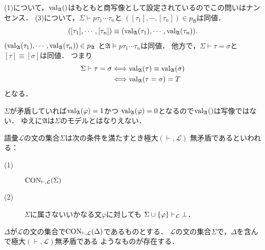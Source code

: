 	\begin{sketch}
		(1)について，$\operatorname{val}_{\mathfrak{A}}()$はもともと商写像として設定されているのでこの問いはナンセンス．
		(3)について，$\Sigma \vdash p\tau_{1}\cdots\tau_{n}$と
			$([\tau_{1}],\cdots,[\tau_{n}]) \in p_{\mathfrak{A}}$は同値．
			\begin{align}
				([\tau_{1}],\cdots,[\tau_{n}]) \equiv 
				(\operatorname{val}_{\mathfrak{A}}(\tau_{1}),\cdots,\operatorname{val}_{\mathfrak{A}}(\tau_{n})).
			\end{align}
			$(\operatorname{val}_{\mathfrak{A}}(\tau_{1}),\cdots,\operatorname{val}_{\mathfrak{A}}(\tau_{n})) \in p_{\mathfrak{A}}$
			と$\mathfrak{A} \models p\tau_{1}\cdots\tau_{n}$は同値．
			他方で，$\Sigma \vdash \tau = \sigma$と$[\tau] \equiv [\sigma]$は同値．
			つまり
			\begin{align}
				\Sigma \vdash \tau = \sigma 
				&\Longleftrightarrow 
				\operatorname{val}_{\mathfrak{A}}(\tau) \equiv \operatorname{val}_{\mathfrak{A}}(\sigma) \\
				&\Longleftrightarrow \operatorname{val}_{\mathfrak{A}}(\tau = \sigma) = T
			\end{align}
			となる．
	\end{sketch}
	
	$\Sigma$が矛盾していれば$\operatorname{val}_{\mathfrak{A}}(\varphi) = 1$かつ
	$\operatorname{val}_{\mathfrak{A}}(\varphi) = 0$となるので$\val{\mathfrak{A}}$は写像ではない．
	ゆえに$\mathfrak{A}$は$\Sigma$のモデルとはなりえない．
	
	\begin{screen}
		\begin{dfn}[定義2.12.11]
			語彙$\mathcal{L}$の文の集合$\Sigma$は次の条件を満たすとき極大$(\vdash,\mathcal{L})$
			無矛盾であるといわれる：
			\begin{description}
				\item[(1)] $\operatorname{CON}_{\vdash,\mathcal{L}}(\Sigma)$
				\item[(2)] $\Sigma$に属さないいかなる文$\varphi$に対しても
					$\Sigma \cup \{\varphi\} \vdash_{{\scriptsize \mathcal{L}}} \bot$．
			\end{description}
		\end{dfn}
	\end{screen}
	
	\begin{screen}
		\begin{thm}[補題2.12.12]
			$\Delta$が$\mathcal{L}$の文の集合で$\operatorname{CON}_{\vdash,\mathcal{L}}(\Delta)$であるものとする．
			$\mathcal{L}$の文の集合$\Sigma$で，$\Delta$を含んで極大$(\vdash,\mathcal{L})$無矛盾である
			ようなものが存在する．
		\end{thm}
	\end{screen}
	
